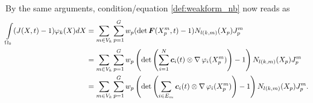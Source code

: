 By the same arguments, condition/equation \eqref{def:weakform_nb} now reads as
\begin{align*}
	\int\limits_{\Omega_0}^{} (J(X,t)-1)\varphi_k(X)dX &= \sum\limits_{m\in V_k}^{}\sum\limits_{p=1}^{G} w_p (\det\boldsymbol{F}(X^m_p,t)-1) N_{l(k,m)}(X_p)J^m_p\\
	&= \sum\limits_{m\in V_k}^{}\sum\limits_{p=1}^{G} w_p \left(\det\left(\sum\limits_{i=1}^{N} \boldsymbol{c}_i(t)\otimes \operatorname{\nabla}\varphi_i(X^m_p)\right)-1\right) N_{l(k,m)}(X_p)J^m_p\\
	&= \sum\limits_{m\in V_k}^{}\sum\limits_{p=1}^{G} w_p \left(\det\left(\sum_{i\in E_m} \boldsymbol{c}_i(t)\otimes \operatorname{\nabla}\varphi_i(X^m_p)\right)-1\right) N_{l(k,m)}(X_p)J^m_p.\\
\end{align*}
